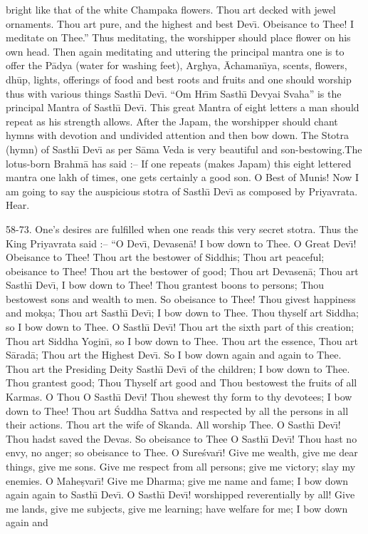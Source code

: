 bright like that of the white Champaka flowers. Thou art decked with jewel ornaments. Thou art pure, and the highest and best Dev\={\i}. Obeisance to Thee! I meditate on Thee.'' Thus meditating, the worshipper should place flower on his own head. Then again meditating and uttering the principal mantra one is to offer the P\=adya (water for washing feet), Arghya, \=Achaman\={\i}ya, scents, flowers, dh\=up, lights, offerings of food and best roots and fruits and one should worship thus with various things Sasth\={\i} Dev\={\i}. ``Om Hr\={\i}m Sasth\={\i} Devyai Svaha'' is the principal Mantra of Sasth\={\i} Dev\={\i}. This great Mantra of eight letters a man should repeat as his strength allows. After the Japam, the worshipper should chant hymns with devotion and undivided attention and then bow down. The Stotra (hymn) of Sasth\={\i} Dev\={\i} as per S\=ama Veda is very beautiful and son-bestowing.The lotus-born Brahm\=a has said :-- If one repeats (makes Japam) this eight lettered mantra one lakh of times, one gets certainly a good son. O Best of Munis! Now I am going to say the auspicious stotra of Sasth\={\i} Dev\={\i} as composed by Priyavrata. Hear.

58-73. One's desires are fulfilled when one reads this very secret stotra. Thus the King Priyavrata said :-- ``O Dev\={\i}, Devasen\=a! I bow down to Thee. O Great Dev\={\i}! Obeisance to Thee! Thou art the bestower of Siddhis; Thou art peaceful; obeisance to Thee! Thou art the bestower of good; Thou art Devasen\=a; Thou art Sasth\={\i} Dev\={\i}, I bow down to Thee! Thou grantest boons to persons; Thou bestowest sons and wealth to men. So obeisance to Thee! Thou givest happiness and mok\d{s}a; Thou art Sasth\={\i} Dev\={\i}; I bow down to Thee. Thou thyself art Siddha; so I bow down to Thee. O Sasth\={\i} Dev\={\i}! Thou art the sixth part of this creation; Thou art Siddha Yogin\={\i}, so I bow down to Thee. Thou art the essence, Thou art S\=arad\=a; Thou art the Highest Dev\={\i}. So I bow down again and again to Thee. Thou art the Presiding Deity Sasth\={\i} Dev\={\i} of the children; I bow down to Thee. Thou grantest good; Thou Thyself art good and Thou bestowest the fruits of all Karmas. O Thou O Sasth\={\i} Dev\={\i}! Thou shewest thy form to thy devotees; I bow down to Thee! Thou art \'Suddha Sattva and respected by all the persons in all their actions. Thou art the wife of Skanda. All worship Thee. O Sasth\={\i} Dev\={\i}! Thou hadst saved the Devas. So obeisance to Thee O Sasth\={\i} Dev\={\i}! Thou hast no envy, no anger; so obeisance to Thee. O Sure\'svar\={\i}! Give me wealth, give me dear things, give me sons. Give me respect from all persons; give me victory; slay my enemies. O Mahe\d{s}var\={\i}! Give me Dharma; give me name and fame; I bow down again again to Sasth\={\i} Dev\={\i}. O Sasth\={\i} Dev\={\i}! worshipped reverentially by all! Give me lands, give me subjects, give me learning; have welfare for me; I bow down again and

